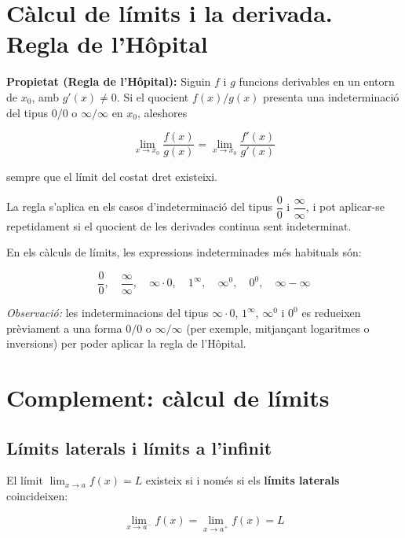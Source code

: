 \section{Càlcul de límits i la derivada. Regla de l'Hôpital}

\textbf{Propietat (Regla de l'Hôpital):} Siguin $f$ i $g$ funcions derivables en un entorn de $x_0$, amb $g'(x) \neq 0$. Si el quocient $f(x)/g(x)$ presenta una indeterminació del tipus $0/0$ o $\infty/\infty$ en $x_0$, aleshores

\begin{equation}
\lim_{x\to x_0} \frac{f(x)}{g(x)} = \lim_{x\to x_0} \frac{f'(x)}{g'(x)}
\end{equation}

sempre que el límit del costat dret existeixi.

La regla s'aplica en els casos d'indeterminació del tipus $\dfrac{0}{0}$ i $\dfrac{\infty}{\infty}$, i pot aplicar-se repetidament si el quocient de les derivades continua sent indeterminat.

En els càlculs de límits, les expressions indeterminades més habituals són:

\begin{equation*}
\frac{0}{0},\quad \frac{\infty}{\infty},\quad \infty\cdot 0,\quad 1^\infty,\quad \infty^0,\quad 0^0,\quad \infty-\infty
\end{equation*}

\emph{Observació:} les indeterminacions del tipus $\infty\cdot 0$, $1^\infty$, $\infty^0$ i $0^0$ es redueixen prèviament a una forma $0/0$ o $\infty/\infty$ (per exemple, mitjançant logaritmes o inversions) per poder aplicar la regla de l'Hôpital.

\section{Complement: càlcul de límits}

\subsection{Límits laterals i límits a l'infinit}

El límit $\displaystyle\lim_{x\to a} f(x) = L$ existeix si i només si els \textbf{límits laterals} coincideixen:

\begin{equation*}
\lim_{x\to a^-} f(x) = \lim_{x\to a^+} f(x) = L
\end{equation*}

